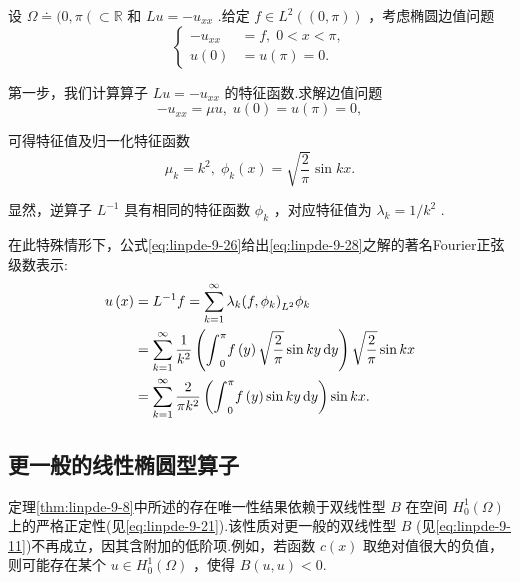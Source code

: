 \begin{instance}\label{ins:linpde-9-10}
设 $\Omega  \doteq  ( 0,\pi \left(  { \subset  \mathbb{R}}\right.$ 和 ${Lu} =  - {u}_{xx}$ .给定 $f \in  {L}^{2}\left( {( 0,\pi ) }\right)$ ，考虑椭圆边值问题
\begin{equation}\tag{9.28}\label{eq:linpde-9-28}
\begin{cases}  - {u}_{xx} &  = f,\;0 < x < \pi , \\  u\left( 0\right) &  = u\left( \pi \right)  = 0. \end{cases}
\end{equation}

第一步，我们计算算子 ${Lu} =  - {u}_{xx}$ 的特征函数.求解边值问题
\[
- {u}_{xx} = {\mu u},\;u\left( 0\right)  = u\left( \pi \right)  = 0,
\]

可得特征值及归一化特征函数
\[
{\mu }_{k} = {k}^{2},\;{\phi }_{k}\left( x\right)  = \sqrt{\frac{2}{\pi }}\sin {kx}.
\]

显然，逆算子 ${L}^{-1}$ 具有相同的特征函数 ${\phi }_{k}$ ，对应特征值为 ${\lambda }_{k} = 1/{k}^{2}$ .

在此特殊情形下，公式\eqref{eq:linpde-9-26}给出\eqref{eq:linpde-9-28}之解的著名Fourier正弦级数表示:
{\begin{align*}
    u\left( x\right)  &= {L}^{-1}f = \sum_{{k = 1}}^{\infty }{\lambda }_{k}{\left( f,{\phi }_{k}\right) }_{{L}^{2}}{\phi }_{k}\\
    &= \sum_{{k = 1}}^{\infty }\frac{1}{{k}^{2}}\left( {{\int }_{0}^{\pi }f\left( y\right) \sqrt{\frac{2}{\pi }}\sin {ky\mathop{}\!\mathrm{d}y}}\right) \sqrt{\frac{2}{\pi }}\sin {kx}\\
    &= \sum_{{k = 1}}^{\infty }\frac{2}{\pi {k}^{2}}\left( {{\int }_{0}^{\pi }f\left( y\right) \sin {ky\mathop{}\!\mathrm{d}y}}\right) \sin {kx}.
\end{align*}}

\end{instance}

\subsection{更一般的线性椭圆型算子}
定理\ref{thm:linpde-9-8}中所述的存在唯一性结果依赖于双线性型 $B$ 在空间 ${H}_{0}^{1}\left( \Omega \right)$ 上的严格正定性(见\eqref{eq:linpde-9-21}).该性质对更一般的双线性型 $B$ (见\eqref{eq:linpde-9-11})不再成立，因其含附加的低阶项.例如，若函数 $c\left( x\right)$ 取绝对值很大的负值，则可能存在某个 $u \in  {H}_{0}^{1}\left( \Omega \right)$ ，使得 $B\left(  {u,u}\right)   < 0.$

